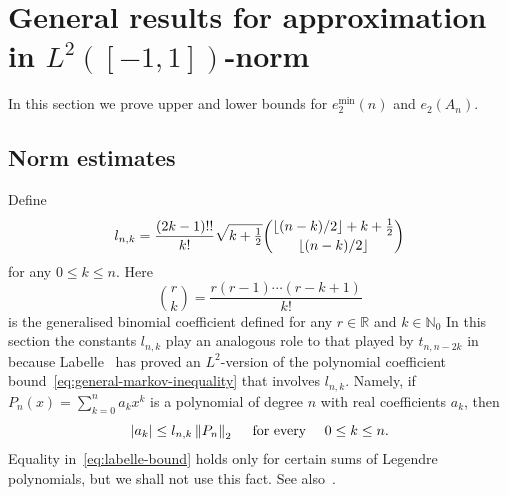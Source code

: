 \documentclass{mcom-l}
\numberwithin{equation}{section}
\numberwithin{theorem}{section} %
\DeclarePairedDelimiter{\floor}{\lfloor}{\rfloor}         %
\newcommand{\R}{\mathbb{R}} %
\newcommand{\N}{\mathbb{N}} %
\begin{document}
\section{General results for approximation in $L^2([-1, 1])$-norm} \label{sec:L2}

In this section we prove upper and lower bounds for $e_2^{\min}(n)$ and $e_2(A_n)$.

\subsection{Norm estimates}

Define
\begin{equation} \label{eq:lnk-definition}
  l_{n,k} = \frac{(2k-1)!!}{k!} \sqrt{\smash[b]{k+\tfrac{1}{2}}} \binom{\floor{(n-k)/2} + k + \frac{1}{2}}{\floor{(n-k)/2}}
\end{equation}
for any $0 \leq k \leq n$.
Here
\begin{equation*}
  \binom{r}{k} = \frac{r(r-1) \cdots (r-k+1)}{k!}
\end{equation*}
is the generalised binomial coefficient defined for any $r \in \R$ and $k \in \N_0$ 
In this section the constants $l_{n,k}$ play an analogous role to that played by $t_{n, n - 2k}$ in  because Labelle~\cite{Labelle1969} has proved an $L^2$-version of the polynomial coefficient bound~\eqref{eq:general-markov-inequality} that involves $l_{n,k}$.
Namely, if $P_n(x) = \sum_{k=0}^n a_k x^k$ is a polynomial of degree $n$ with real coefficients $a_k$, then
\begin{equation} \label{eq:labelle-bound}
  \abs[0]{a_k} \leq l_{n,k} \norm[0]{P_n}_{2} \quad \text{ for every } \quad 0 \leq k \leq n.
\end{equation}
Equality in~\eqref{eq:labelle-bound} holds only for certain sums of Legendre polynomials, but we shall not use this fact.
See also~\cite[pp.\@~676--7]{RahmanSchmeisser2002}.
\end{document}
